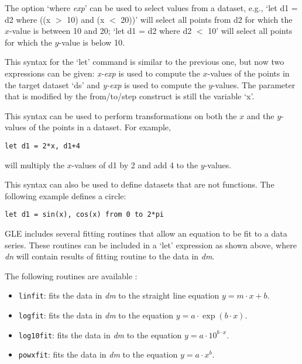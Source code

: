 \begin{commanddescription}
The option `where {\it exp}' can be used to select values from a dataset, e.g., `let d1 = d2 where ((x $>$ 10) and (x $<$ 20))' will select all points from d2 for which the $x$-value is between 10 and 20; `let d1 = d2 where d2 $<$ 10' will select all points for which the $y$-value is below 10.

\item[{\sf let ds = {\it x-exp, y-exp {\sf [from} low{\sf] [to} high{\sf] [step} exp{\sf] [where} exp{\sf]}}}]

This syntax for the `let' command is similar to the previous one, but now two expressions can be given: {\it x-exp} is used to compute the $x$-values of the points in the target dataset `ds' and {\it y-exp} is used to compute the $y$-values. The parameter that is modified by the from/to/step construct is still the variable `x'.

This syntax can be used to perform transformations on both the $x$ and the $y$-values of the points in a dataset. For example,

\begin{Verbatim}
let d1 = 2*x, d1+4
\end{Verbatim}

will multiply the $x$-values of d1 by 2 and add 4 to the $y$-values. 

This syntax can also be used to define datasets that are not functions. The following example defines a circle:

\begin{Verbatim}
let d1 = sin(x), cos(x) from 0 to 2*pi
\end{Verbatim}

\item[{\sf let {\it dn} = [routine] {\it dm} [options] [{\it slopevar}] [{\it offsetvar}] [{\it rsqvar}]}]

GLE includes several fitting routines that allow an equation to be fit to a data series. These routines can be included in a `let' expression as shown above, where {\it dn} will contain results of fitting {\sf routine} to the data in {\it dm}.

The following routines are available :
\begin{itemize}
\item \texttt{linfit}: fits the data in \textit{dm} to the straight line equation $y = m \cdot x + b$.
\item \texttt{logfit}: fits the data in \textit{dm} to the equation $y = a \cdot \exp(b \cdot x)$.
\item \texttt{log10fit}: fits the data in \textit{dm} to the equation $y = a \cdot 10^{b \cdot x}$.
\item \texttt{powxfit}: fits the data in \textit{dm} to the equation $y = a \cdot x^b$.
\end{itemize}


\end{commanddescription}
